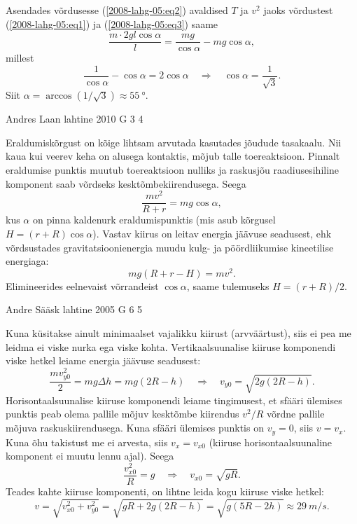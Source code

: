 \documentclass[11pt, twoside]{article}
\begin{document}
{{Asendades võrdusesse (\ref{2008-lahg-05:eq2}) avaldised $T$ ja $v^2$
jaoks võrdustest (\ref{2008-lahg-05:eq1}) ja (\ref{2008-lahg-05:eq3}) saame
\[
\frac{m \cdot 2 g l \cos \alpha}{l}=\frac{m g}{\cos \alpha}-m g \cos \alpha,
\]
millest
\[
\frac{1}{\cos \alpha}-\cos \alpha=2 \cos \alpha \quad \Rightarrow\quad \cos \alpha=\frac{1}{\sqrt{3}}.
\]
Siit $\alpha = \arccos \left( 1/ \sqrt 3\right) \approx \SI{55}{\degree}$.
\fi
}

{Andres Laan} %
{lahtine} %
{2010} %
{G 3} %
{4} %
{

\ifSolution
Eraldumiskõrgust on kõige lihtsam arvutada kasutades jõudude tasakaalu. 
Nii kaua kui veerev keha on alusega kontaktis, mõjub talle toereaktsioon. 
Pinnalt eraldumise punktis muutub toereaktsioon nulliks ja raskusjõu raadiusesihiline 
komponent saab võrdseks kesktõmbekiirendusega. Seega
\[
\frac{mv^2}{R+r}=mg\cos\alpha,
\]
kus $\alpha$ on pinna kaldenurk eraldumispunktis (mis asub kõrgusel $H=(r+R)\cos\alpha$). 
Vastav kiirus on leitav energia jäävuse seadusest, ehk
võrdsustades gravitatsioonienergia muudu kulg- ja pöördliikumise kineetilise energiaga:
\[
mg(R+r-H)=mv^2.
\]
Elimineerides eelnevaist võrrandeist $\cos\alpha$, saame tulemuseks $H=(r+R)/2$.
\fi
}

{Andre Sääsk} %
{lahtine} %
{2005} %
{G 6} %
{5} %
{

\ifSolution
Kuna küsitakse ainult minimaalset vajalikku kiirust (arvväärtust), siis ei pea me leidma ei viske nurka ega viske kohta. Vertikaalsuunalise kiiruse komponendi viske hetkel leiame energia jäävuse seadusest:
\[
\frac{m v_{y 0}^{2}}{2}=m g \Delta h=m g(2 R-h) \quad \Rightarrow \quad v_{y 0}=\sqrt{2 g(2 R-h)}.
\]
Horisontaalsuunalise kiiruse komponendi leiame tingimusest, et sfääri ülemises punktis peab olema pallile mõjuv kesktõmbe kiirendus $v^2/R$ võrdne pallile mõjuva raskuskiirendusega. Kuna sfääri ülemises punktis on $v_y = 0$, siis $v = v_x$. Kuna õhu takistust me ei arvesta, siis $v_x = v_{x0}$ (kiiruse horisontaalsuunaline komponent ei muutu lennu ajal). Seega
\[
\frac{v_{x 0}^{2}}{R}=g \quad \Rightarrow \quad v_{x 0}=\sqrt{g R}.
\]
Teades kahte kiiruse komponenti, on lihtne leida kogu kiiruse viske hetkel:
\[
v=\sqrt{v_{x 0}^{2}+v_{y 0}^{2}}=\sqrt{g R+2 g(2 R-h)}=\sqrt{g(5 R-2 h)} \approx \SI{29}{m/s}.
\]

\vspace{0.5\baselineskip}

}}
\end{document}

